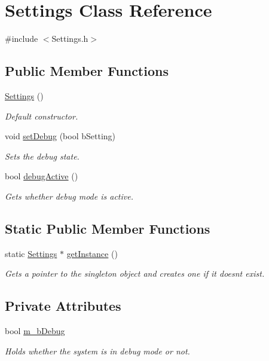 \hypertarget{class_settings}{}\section{Settings Class Reference}
\label{class_settings}


{\ttfamily \#include $<$Settings.\+h$>$}

\subsection*{Public Member Functions}
\begin{DoxyCompactItemize}
\item 
\hyperlink{class_settings_ab7169a6eefce79566dd07db3b1e5e967}{Settings} ()
\begin{DoxyCompactList}\small\item\em Default constructor. \end{DoxyCompactList}\item 
void \hyperlink{class_settings_a1c098494c4aef82ac1fa267735d544d1}{set\+Debug} (bool b\+Setting)
\begin{DoxyCompactList}\small\item\em Sets the debug state. \end{DoxyCompactList}\item 
bool \hyperlink{class_settings_a09f352700bc34e1c4cc6ce50a6e54371}{debug\+Active} ()
\begin{DoxyCompactList}\small\item\em Gets whether debug mode is active. \end{DoxyCompactList}\end{DoxyCompactItemize}
\subsection*{Static Public Member Functions}
\begin{DoxyCompactItemize}
\item 
static \hyperlink{class_settings}{Settings} $\ast$ \hyperlink{class_settings_a1d30c7fd15c578e94f3c87212c2340da}{get\+Instance} ()
\begin{DoxyCompactList}\small\item\em Gets a pointer to the singleton object and creates one if it doesnt exist. \end{DoxyCompactList}\end{DoxyCompactItemize}
\subsection*{Private Attributes}
\begin{DoxyCompactItemize}
\item 
bool \hyperlink{class_settings_a45f5b31eac0c8566eef1615368d5b893}{m\+\_\+b\+Debug}
\begin{DoxyCompactList}\small\item\em Holds whether the system is in debug mode or not. \end{DoxyCompactList}\end{DoxyCompactItemize}
